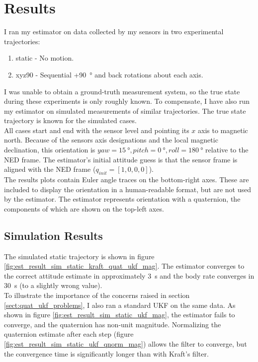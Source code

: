 \documentclass[conference]{IEEEtran}
\begin{document}
\section{Results}
I ran my estimator on data collected by my sensors in two experimental trajectories:
\begin{enumerate}
    \item static - No motion.
    \item xyz90 - Sequential +\SI{90}{\degree} and back rotations about each axis.
\end{enumerate}
I was unable to obtain a ground-truth measurement system, so the true state during these experiments is only roughly known. To compensate, I have also run my estimator on simulated measurements of similar trajectories. The true state trajectory is known for the simulated cases.\\

All cases start and end with the sensor level and pointing its $x$ axis to magnetic north. Because of the sensors axis designations and the local magnetic declination, this orientation is $yaw = \SI{15}{\degree}, pitch = \SI{0}{\degree}, roll = \SI{180}{\degree}$ relative to the NED frame. The estimator's initial attitude guess is that the sensor frame is aligned with the NED frame ($q_{init} = [1, 0, 0, 0]$).\\

The results plots contain Euler angle traces on the bottom-right axes. These are included to display the orientation in a human-readable format, but are not used by the estimator. The estimator represents orientation with a quaternion, the components of which are shown on the top-left axes.\\

\subsection{Simulation Results}
The simulated static trajectory is shown in figure \ref{fig:est_result_sim_static_kraft_quat_ukf_mag}. The estimator converges to the correct attitude estimate in approximately \SI{3}{\second} and the body rate converges in \SI{30}{\second} (to a slightly wrong value).\\

To illustrate the importance of the concerns raised in section \ref{sect:quat_ukf_problems}, I also ran a standard UKF on the same data. As shown in figure \ref{fig:est_result_sim_static_ukf_mag}, the estimator fails to converge, and the quaternion has non-unit magnitude. Normalizing the quaternion estimate after each step (figure \ref{fig:est_result_sim_static_ukf_qnorm_mag}) allows the filter to converge, but the convergence time is significantly longer than with Kraft's filter.\\
\end{document}
